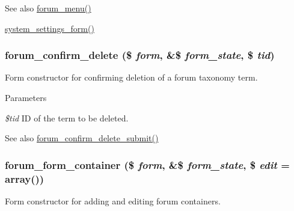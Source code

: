 \begin{DoxySeeAlso}{See also}
\hyperlink{forum_8module_a0421197a60856c7ee2cf2511f0d54ffc}{forum\_\-menu()} 

\hyperlink{group__forms_ga6fb270d34465d846cd4659a85d3e40c8}{system\_\-settings\_\-form()} 
\end{DoxySeeAlso}
\hypertarget{group__forms_ga2e160e8a91338ff16883e27d806eb63e}{
\subsubsection[{forum\_\-confirm\_\-delete}]{\setlength{\rightskip}{0pt plus 5cm}forum\_\-confirm\_\-delete (\$ {\em form}, \/  \&\$ {\em form\_\-state}, \/  \$ {\em tid})}}
\label{group__forms_ga2e160e8a91338ff16883e27d806eb63e}
Form constructor for confirming deletion of a forum taxonomy term.


\begin{DoxyParams}{Parameters}
\item[{\em \$tid}]ID of the term to be deleted.\end{DoxyParams}
\begin{DoxySeeAlso}{See also}
\hyperlink{forum_8admin_8inc_aef93d685b6f28845e233fc1f697c05ab}{forum\_\-confirm\_\-delete\_\-submit()} 
\end{DoxySeeAlso}
\hypertarget{group__forms_gaaf28a1fc0cf33c8cc9f8ffd08fad202c}{
\subsubsection[{forum\_\-form\_\-container}]{\setlength{\rightskip}{0pt plus 5cm}forum\_\-form\_\-container (\$ {\em form}, \/  \&\$ {\em form\_\-state}, \/  \$ {\em edit} = {\ttfamily array()})}}
\label{group__forms_gaaf28a1fc0cf33c8cc9f8ffd08fad202c}
Form constructor for adding and editing forum containers.


